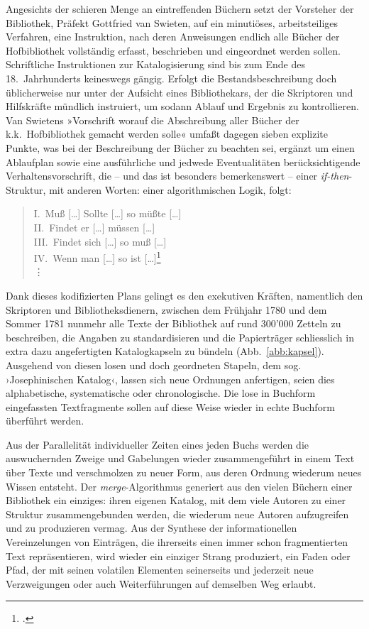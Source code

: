 \documentclass[a4paper,10pt]{article}
\newcommand{\anf}[1]{»#1«}
\newcommand{\inanf}[1]{›#1‹}
\begin{document}
Angesichts der schieren Menge an eintreffenden Büchern setzt der Vorsteher der Bibliothek, Präfekt Gottfried van Swieten, auf ein minutiöses, arbeitsteiliges Verfahren, eine Instruktion, nach deren Anweisungen endlich alle Bücher der Hofbibliothek vollständig erfasst, beschrieben und eingeordnet werden sollen. Schriftliche Instruktionen zur Katalogisierung sind bis zum Ende des 18.~Jahrhunderts keineswegs gängig. Erfolgt die Bestandsbeschreibung doch üblicherweise nur unter der Aufsicht eines Bibliothekars, der die Skriptoren und Hilfskräfte mündlich instruiert, um sodann Ablauf und Ergebnis zu kontrollieren. Van Swietens \anf{Vorschrift worauf die Abschreibung aller Bücher der k.k.~Hofbibliothek gemacht werden solle} umfaßt dagegen sieben explizite Punkte, was bei der Beschreibung der Bücher zu beachten sei, ergänzt um einen Ablaufplan sowie eine ausführliche und jedwede Eventualitäten berücksichtigende Verhaltensvorschrift, die – und das ist besonders bemerkenswert – einer \emph{if-then}-Struktur, mit anderen Worten: einer algorithmischen Logik, folgt:
\begin{verse}
I.~Muß [\ldots] Sollte [\ldots] so müßte [\ldots]\\
II.~Findet er [\ldots] müssen [\ldots]\\
III.~Findet sich [\ldots] so muß [\ldots]\\ 
IV.~Wenn man [\ldots] so ist [\ldots]\footcite[125 f.]{bartsch:1780}\\
\qquad\vdots\\ %
\end{verse}
Dank dieses kodifizierten Plans gelingt es den exekutiven Kräften, namentlich den Skriptoren und Bibliotheksdienern, zwischen dem Frühjahr 1780 und dem Sommer 1781 nunmehr alle Texte der Bibliothek auf rund 300'000 Zetteln zu beschreiben, die Angaben zu standardisieren und die Papierträger schliesslich in extra dazu angefertigten Katalogkapseln zu bündeln (Abb.~\ref{abb:kapsel}). Ausgehend von diesen losen und doch geordneten Stapeln, dem sog. \inanf{Josephinischen Katalog}, lassen sich neue Ordnungen anfertigen, seien dies alphabetische, systematische oder chronologische. Die lose in Buchform eingefassten Textfragmente sollen auf diese Weise wieder in echte Buchform überführt werden.

Aus der Parallelität individueller Zeiten eines jeden Buchs werden die auswuchernden Zweige und Gabelungen wieder zusammengeführt in einem Text über Texte und verschmolzen zu neuer Form, aus deren Ordnung wiederum neues Wissen entsteht. Der  \emph{merge}-Algorithmus generiert aus den vielen Büchern einer Bibliothek ein einziges: ihren eigenen Katalog, mit dem viele Autoren zu einer Struktur zusammengebunden werden, die wiederum neue Autoren aufzugreifen und zu produzieren vermag. Aus der Synthese der informationellen Vereinzelungen von Einträgen, die ihrerseits einen immer schon fragmentierten Text repräsentieren, wird wieder ein einziger Strang produziert, ein Faden oder Pfad, der mit seinen volatilen Elementen seinerseits und jederzeit neue Verzweigungen oder auch Weiterführungen auf demselben Weg erlaubt.
\end{document}
